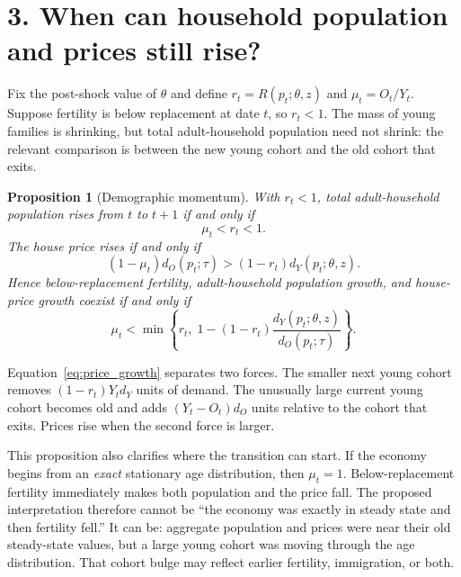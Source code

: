 \documentclass[11pt]{article}
\newtheorem{proposition}{Proposition}
\newcommand{\dY}{d_Y}
\newcommand{\dO}{d_O}
\begin{document}
\section*{3. When can household population and prices still rise?}

Fix the post-shock value of $\theta$ and define
$r_t=R(p_t;\theta,z)$ and $\mu_t=O_t/Y_t$. Suppose fertility is below
replacement at date $t$, so $r_t<1$. The mass of young families is shrinking,
but total adult-household population need not shrink: the relevant comparison is between
the new young cohort and the old cohort that exits.

\begin{proposition}[Demographic momentum]
\label{prop:momentum}
With $r_t<1$, total adult-household population rises from $t$ to $t+1$ if and only if
\begin{equation}
 \mu_t<r_t<1.
 \label{eq:population_growth}
\end{equation}
The house price rises if and only if
\begin{equation}
 (1-\mu_t)\dO(p_t;\tau)
 >(1-r_t)\dY(p_t;\theta,z).
 \label{eq:price_growth}
\end{equation}
Hence below-replacement fertility, adult-household population growth, and house-price growth
coexist if and only if
\begin{equation}
 \mu_t<\min\left\{
 r_t,\;
 1-(1-r_t)\frac{\dY(p_t;\theta,z)}{\dO(p_t;\tau)}
 \right\}.
 \label{eq:joint_condition}
\end{equation}
\end{proposition}

Equation~\eqref{eq:price_growth} separates two forces. The smaller next young
cohort removes $(1-r_t)Y_t\dY$ units of demand. The unusually large current
young cohort becomes old and adds $(Y_t-O_t)\dO$ units relative to the cohort
that exits. Prices rise when the second force is larger.

This proposition also clarifies where the transition can start. If the economy
begins from an \emph{exact} stationary age distribution, then $\mu_t=1$.
Below-replacement fertility immediately makes both population and the price
fall. The proposed interpretation therefore cannot be ``the economy was
exactly in steady state and then fertility fell.'' It can be: aggregate
population and prices were near their old steady-state values, but a large
young cohort was moving through the age distribution. That cohort bulge may
reflect earlier fertility, immigration, or both.
\end{document}
